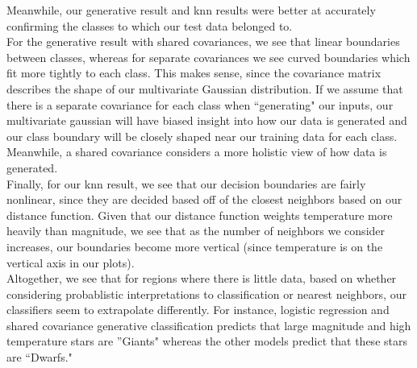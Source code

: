 \documentclass[submit]{harvardml}
\begin{document}
\begin{enumerate}
    Meanwhile, our generative result and knn results were better at accurately confirming the classes to which our test data belonged to. \\
    For the generative result with shared covariances, we see that linear boundaries between classes, whereas for separate covariances we see curved boundaries which fit more tightly to each class. This makes sense, since the covariance matrix describes the shape of our multivariate Gaussian distribution. If we assume that there is a separate covariance for each class when ``generating" our inputs, our multivariate gaussian will have biased insight into how our data is generated and our class boundary will be closely shaped near our training data for each class. Meanwhile, a shared covariance considers a more holistic view of how data is generated. \\
    Finally, for our knn result, we see that our decision boundaries are fairly nonlinear, since they are decided based off of the closest neighbors based on our distance function. Given that our distance function weights temperature more heavily than magnitude, we see that as the number of neighbors we consider increases, our boundaries become more vertical (since temperature is on the vertical axis in our plots). \\
    Altogether, we see that for regions where there is little data, based on whether considering probablistic interpretations to classification or nearest neighbors, our classifiers seem to extrapolate differently. For instance, logistic regression and shared covariance generative classification predicts that large magnitude and high temperature stars are ''Giants" whereas the other models predict that these stars are ``Dwarfs."
    

\end{enumerate}
\end{document}
